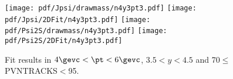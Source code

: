 \begin{figure}[H]
\begin{center}
\texttt{[image: pdf/Jpsi/drawmass/n4y3pt3.pdf]}
\texttt{[image: pdf/Jpsi/2DFit/n4y3pt3.pdf]}
\vspace*{-0.5cm}
\texttt{[image: pdf/Psi2S/drawmass/n4y3pt3.pdf]}
\texttt{[image: pdf/Psi2S/2DFit/n4y3pt3.pdf]}
\vspace*{-0.5cm}
\end{center}
\caption{Fit results in $4\gevc<\pt<6\gevc$, $3.5<y<4.5$ and 70$\leq$PVNTRACKS$<$95.}
\label{Fitn4y3pt3}
\end{figure}
